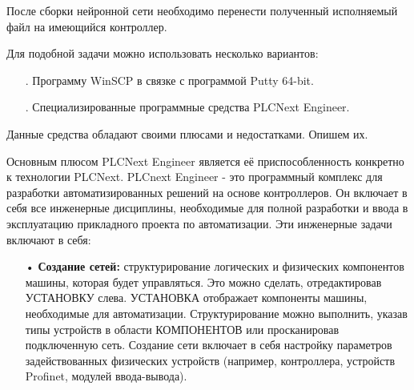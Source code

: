 {\gostFont
	
	\par \redline После сборки нейронной сети необходимо перенести полученный исполняемый файл на имеющийся контроллер.
	
	\par \redline Для подобной задачи можно использовать несколько вариантов:
	
	\begin{itemize}[leftmargin=2.15cm, labelwidth=0.65cm, labelsep=0.0cm] 
		
		\item[\theitemcntr. ]	Программу WinSCP в связке с программой Putty 64-bit. 
		\addtocounter{itemcntr}{1}
		
		\item[\theitemcntr. ] 	Специализированные программные средства PLCNext Engineer. 
		
		\addtocounter{itemcntr}{1}
		
		\setcounter{itemcntr}{1}
	\end{itemize} 	
	
	\par \redline Данные средства обладают своими плюсами и недостатками. Опишем их. 
	
	\par \redline Основным плюсом PLCNext Engineer является её приспособленность конкретно к технологии PLCNext. PLCnext Engineer - это программный комплекс для разработки автоматизированных решений на основе контроллеров. Он включает в себя все инженерные дисциплины, необходимые для полной разработки и ввода в эксплуатацию прикладного проекта по автоматизации. Эти инженерные задачи включают в себя:
	
		\begin{itemize}[leftmargin=2.15cm, labelwidth=0.65cm, labelsep=0.0cm] 
		
		\item[•] \textbf{Создание сетей:}  структурирование логических и физических компонентов машины, которая будет управляться. Это можно сделать, отредактировав УСТАНОВКУ слева. УСТАНОВКА отображает компоненты машины, необходимые для автоматизации. Структурирование можно выполнить, указав типы устройств в области КОМПОНЕНТОВ или просканировав подключенную сеть. Создание сети включает в себя настройку параметров задействованных физических устройств (например, контроллера, устройств Profinet, модулей ввода-вывода).
		\addtocounter{itemcntr}{1}
		

\end{itemize}}

